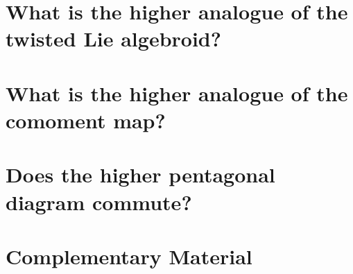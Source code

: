 \documentclass[10pt]{beamer}
\begin{document}
\section{What is the \textbf{higher analogue} of the \textbf{twisted Lie algebroid}?}
\checkpoint	
%	

\section{What is the \textbf{higher analogue} of the \textbf{comoment map}?}
\checkpoint	
%	


\section{Does the \textbf{higher pentagonal diagram commute}?}
\checkpoint	
%	


\appendix
\section{Complementary Material}
%	










\end{document}
